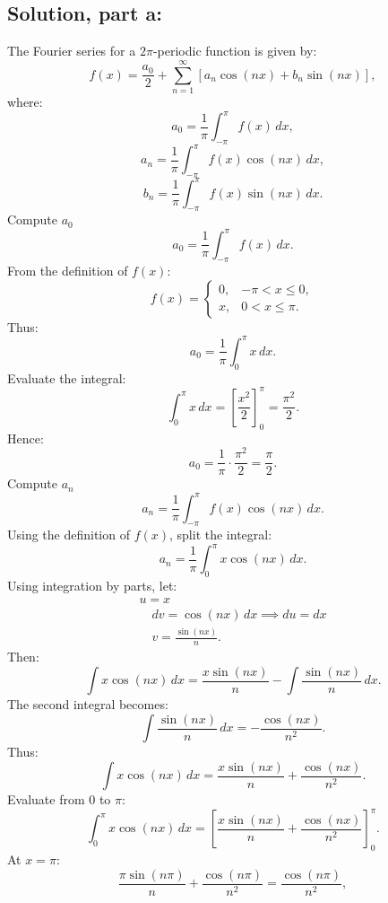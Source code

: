 \documentclass[12pt]{article}
\begin{document}
    \subsection*{Solution, part a:}
        The Fourier series for a \(2\pi\)-periodic function is given by:
        \[
        f(x) = \frac{a_0}{2} + \sum_{n=1}^\infty \left[a_n \cos(nx) + b_n \sin(nx)\right],
        \]
        where:
        \[
        a_0 = \frac{1}{\pi} \int_{-\pi}^\pi f(x) \, dx,
        \]
        \[
        a_n = \frac{1}{\pi} \int_{-\pi}^\pi f(x) \cos(nx) \, dx,
        \]
        \[
        b_n = \frac{1}{\pi} \int_{-\pi}^\pi f(x) \sin(nx) \, dx.
        \]
        Compute \(a_0\)
        \[
        a_0 = \frac{1}{\pi} \int_{-\pi}^\pi f(x) \, dx.
        \]
        From the definition of \(f(x)\):
        \[
        f(x) = 
        \begin{cases} 
        0, & -\pi < x \leq 0, \\
        x, & 0 < x \leq \pi.
        \end{cases}
        \]
        Thus:
        \[
        a_0 = \frac{1}{\pi} \int_0^\pi x \, dx.
        \]
        Evaluate the integral:
        \[
        \int_0^\pi x \, dx = \left[\frac{x^2}{2}\right]_0^\pi = \frac{\pi^2}{2}.
        \]
        Hence:
        \[
        a_0 = \frac{1}{\pi} \cdot \frac{\pi^2}{2} = \frac{\pi}{2}.
        \]
        Compute \(a_n\)
        \[
        a_n = \frac{1}{\pi} \int_{-\pi}^\pi f(x) \cos(nx) \, dx.
        \]
        Using the definition of \(f(x)\), split the integral:
        \[
        a_n = \frac{1}{\pi} \int_0^\pi x \cos(nx) \, dx.
        \]
        Using integration by parts, let:
        \[
        \begin{split}
            u = x
            \\ \quad dv = \cos(nx) \, dx \implies du = dx
            \\ \quad v = \frac{\sin(nx)}{n}.    
        \end{split}
        \]
        Then:
        \[
        \int x \cos(nx) \, dx = \frac{x \sin(nx)}{n} - \int \frac{\sin(nx)}{n} \, dx.
        \]
        The second integral becomes:
        \[
        \int \frac{\sin(nx)}{n} \, dx = -\frac{\cos(nx)}{n^2}.
        \]
        Thus:
        \[
        \int x \cos(nx) \, dx = \frac{x \sin(nx)}{n} + \frac{\cos(nx)}{n^2}.
        \]
        Evaluate from \(0\) to \(\pi\):
        \[
        \int_0^\pi x \cos(nx) \, dx = \left[\frac{x \sin(nx)}{n} + \frac{\cos(nx)}{n^2}\right]_0^\pi.
        \]
        At \(x = \pi\):
        \[
        \frac{\pi \sin(n\pi)}{n} + \frac{\cos(n\pi)}{n^2} = \frac{\cos(n\pi)}{n^2},
        \]
\end{document}
